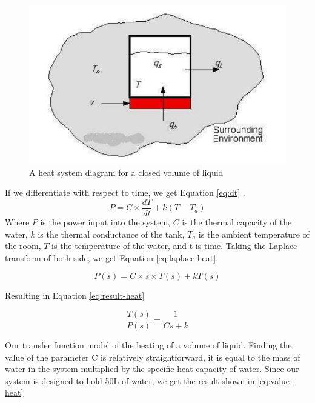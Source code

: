 \documentclass{article}
\begin{document}
\begin{figure}[H]
\begin{center}
\includegraphics[scale=0.50]{heat-system-diagram.png}
\caption{A heat system diagram for a closed volume of liquid \cite{heat-modelling}}
\label{fig:heat-system-diagram}
\end{center}
\end{figure}

\noindent If we differentiate with respect to time, we get Equation \ref{eq:dt} \cite{heat-modelling}.
\begin{equation}
P = C \times \frac{dT}{dt} + k(T - T_{a})
\label{eq:dt}
\end{equation}
\noindent Where $P$ is the power input into the system, $C$ is the thermal capacity of the water, $k$ is the thermal conductance of the tank, $T_{a}$ is the ambient temperature of the room, $T$ is the temperature of the water, and t is time. Taking the Laplace transform of both side, we get Equation \ref{eq:laplace-heat}.

\begin{equation}
P(s) = C \times s \times T(s) + kT(s)
\label{eq:laplace-heat}
\end{equation}

\noindent Resulting in Equation \ref{eq:result-heat}

\begin{equation}
\frac{T(s)}{P(s)} = \frac{1}{Cs + k}
\label{eq:result-heat}
\end{equation}

\noindent Our transfer function model of the heating of a volume of liquid. Finding the value of the parameter C is relatively straightforward, it is equal to the mass of water in the system multiplied by the specific heat capacity of water. Since our system is designed to hold 50L of water, we get the result shown in \ref{eq:value-heat}
\end{document}

